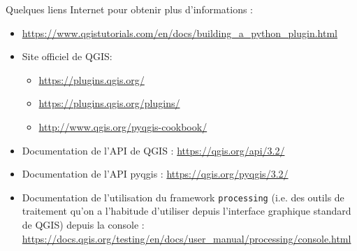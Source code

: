 \documentclass[11pt]{article}
\begin{document}
Quelques liens Internet pour obtenir plus d'informations :
\vspace*{0.4em}
\begin{itemize}\itemsep0.64em
\renewcommand\labelitemi{\---}
\item \url{https://www.qgistutorials.com/en/docs/building_a_python_plugin.html}
\item Site officiel de QGIS:
\begin{itemize}\itemsep0.2em
\renewcommand\labelitemii{\--}
\item \url{https://plugins.qgis.org/}
\item \url{https://plugins.qgis.org/plugins/}
\item \url{http://www.qgis.org/pyqgis-cookbook/}
\end{itemize}
\item Documentation de l'API de QGIS : \url{https://qgis.org/api/3.2/}
\item Documentation de l'API pyqgis : \url{https://qgis.org/pyqgis/3.2/}
\item Documentation de l'utilisation du framework \texttt{processing} (i.e. des outils de traitement qu'on a l'habitude d'utiliser depuis l'interface graphique standard de QGIS) depuis la console : \\
\url{https://docs.qgis.org/testing/en/docs/user_manual/processing/console.html}
\end{itemize}

\vfill{}
\hrulefill
\vspace*{1.6em}

\hrulefill
\vspace*{1.6em}

\hrulefill
\vspace*{1.6em}

\hrulefill
\vspace*{1.6em}

\hrulefill
\vspace*{1.6em}

\hrulefill
\vspace*{1.6em}

\hrulefill
\vspace*{1.6em}

\hrulefill
\vspace*{1.6em}

\hrulefill
\vspace*{1.6em}

\hrulefill
\vspace*{1.6em}

\hrulefill
\vspace*{1.6em}

\hrulefill
\vspace*{1.6em}

\hrulefill
\vspace*{1.6em}

\hrulefill
\vspace*{1.6em}
\end{document}
